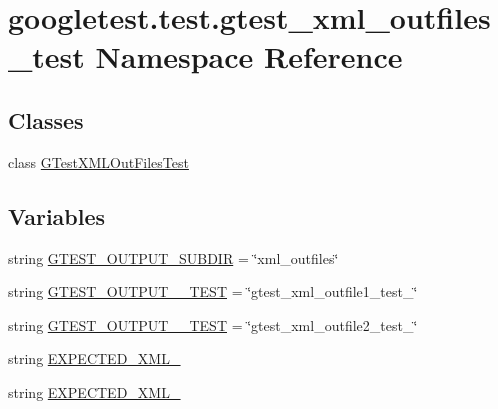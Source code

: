 \hypertarget{namespacegoogletest_1_1test_1_1gtest__xml__outfiles__test}{}\section{googletest.\+test.\+gtest\+\_\+xml\+\_\+outfiles\+\_\+test Namespace Reference}
\label{namespacegoogletest_1_1test_1_1gtest__xml__outfiles__test}
\subsection*{Classes}
\begin{DoxyCompactItemize}
\item 
class \mbox{\hyperlink{classgoogletest_1_1test_1_1gtest__xml__outfiles__test_1_1_g_test_x_m_l_out_files_test}{G\+Test\+X\+M\+L\+Out\+Files\+Test}}
\end{DoxyCompactItemize}
\subsection*{Variables}
\begin{DoxyCompactItemize}
\item 
string \mbox{\hyperlink{namespacegoogletest_1_1test_1_1gtest__xml__outfiles__test_a172fced6c0c1aac2af0b6ccddf5bc0c1}{G\+T\+E\+S\+T\+\_\+\+O\+U\+T\+P\+U\+T\+\_\+\+S\+U\+B\+D\+IR}} = \char`\"{}xml\+\_\+outfiles\char`\"{}
\item 
string \mbox{\hyperlink{namespacegoogletest_1_1test_1_1gtest__xml__outfiles__test_a87913dee1f7d82420f0f4bb925573c30}{G\+T\+E\+S\+T\+\_\+\+O\+U\+T\+P\+U\+T\+\_\+\_\+\+T\+E\+ST}} = \char`\"{}gtest\+\_\+xml\+\_\+outfile1\+\_\+test\+\_\+\char`\"{}
\item 
string \mbox{\hyperlink{namespacegoogletest_1_1test_1_1gtest__xml__outfiles__test_ae451c35e618e6d1740e852337ea86f58}{G\+T\+E\+S\+T\+\_\+\+O\+U\+T\+P\+U\+T\+\_\+\_\+\+T\+E\+ST}} = \char`\"{}gtest\+\_\+xml\+\_\+outfile2\+\_\+test\+\_\+\char`\"{}
\item 
string \mbox{\hyperlink{namespacegoogletest_1_1test_1_1gtest__xml__outfiles__test_aa64a4f1e3b4abc2e6b82f28c2f967041}{E\+X\+P\+E\+C\+T\+E\+D\+\_\+\+X\+M\+L\+\_}}
\item 
string \mbox{\hyperlink{namespacegoogletest_1_1test_1_1gtest__xml__outfiles__test_a71714c83d88e6023fb53cbd55d27182b}{E\+X\+P\+E\+C\+T\+E\+D\+\_\+\+X\+M\+L\+\_}}
\end{DoxyCompactItemize}


